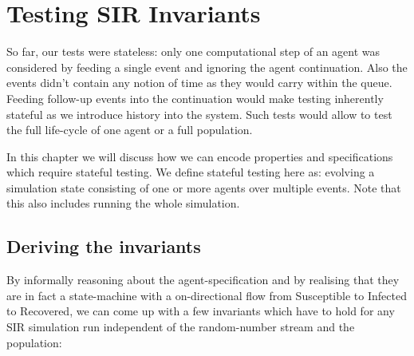 \chapter{Testing SIR Invariants}
\label{ch:sir_invariants}

So far, our tests were stateless: only one computational step of an agent was considered by feeding a single event and ignoring the agent continuation. Also the events didn't contain any notion of time as they would carry within the queue. Feeding follow-up events into the continuation would make testing inherently stateful as we introduce history into the system. Such tests would allow to test the full life-cycle of one  agent or a full population.

In this chapter we will discuss how we can encode properties and specifications which require stateful testing. We define stateful testing here as: evolving a simulation state consisting of one or more agents over multiple events. Note that this also includes running the whole simulation.

\section{Deriving the invariants}
By informally reasoning about the agent-specification and by realising that they are in fact a state-machine with a on-directional flow from Susceptible to Infected to Recovered, we can come up with a few invariants which have to hold for any SIR simulation run independent of the random-number stream and the population:

